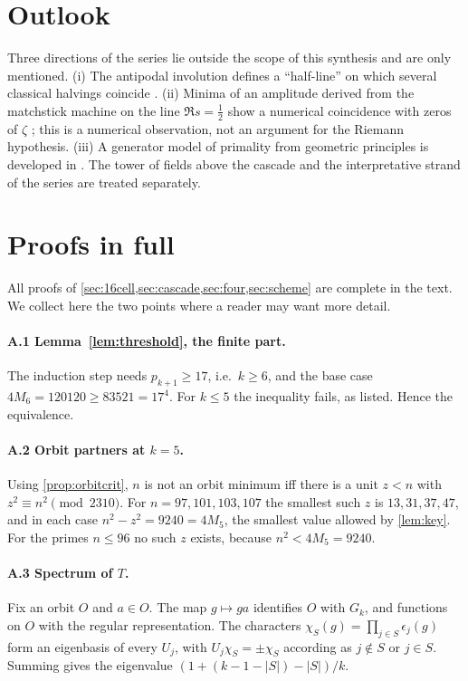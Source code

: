 \documentclass[11pt,a4paper]{article}
\theoremstyle{plain}
\theoremstyle{definition}
\theoremstyle{remark}
\begin{document}
\section{Outlook}\label{sec:outlook}
Three directions of the series lie outside the scope of this synthesis and are
only mentioned. (i) The antipodal involution defines a ``half-line'' on which
several classical halvings coincide \cite{K-halfline}. (ii) Minima of an
amplitude derived from the matchstick machine on the line $\Re s=\frac12$
show a numerical coincidence with zeros of $\zeta$ \cite{K-zeta}; this is a
numerical observation, not an argument for the Riemann hypothesis. (iii) A
generator model of primality from geometric principles is developed in
\cite{K-generator}. The tower of fields above the cascade and the
interpretative strand of the series are treated separately.

\appendix
\section{Proofs in full}\label{app:proofs}
All proofs of \cref{sec:16cell,sec:cascade,sec:four,sec:scheme} are complete
in the text. We collect here the two points where a reader may want more
detail.

\paragraph{A.1 Lemma~\ref{lem:threshold}, the finite part.} The induction step
needs $p_{k+1}\ge17$, i.e.\ $k\ge6$, and the base case
$4M_6=120120\ge83521=17^4$. For $k\le5$ the inequality fails, as listed. Hence
the equivalence.

\paragraph{A.2 Orbit partners at $k=5$.} Using \cref{prop:orbitcrit}, $n$ is
not an orbit minimum iff there is a unit $z<n$ with $z^2\equiv n^2\pmod{2310}$.
For $n=97,101,103,107$ the smallest such $z$ is $13,31,37,47$, and in each
case $n^2-z^2=9240=4M_5$, the smallest value allowed by \cref{lem:key}.
For the primes $n\le96$ no such $z$ exists, because $n^2<4M_5=9240$.

\paragraph{A.3 Spectrum of $T$.} Fix an orbit $O$ and $a\in O$. The map
$g\mapsto ga$ identifies $O$ with $G_k$, and functions on $O$ with the regular
representation. The characters $\chi_S(g)=\prod_{j\in S}\epsilon_j(g)$ form an
eigenbasis of every $U_j$, with $U_j\chi_S=\pm\chi_S$ according as $j\notin S$
or $j\in S$. Summing gives the eigenvalue $(1+(k-1-|S|)-|S|)/k$.
\end{document}
